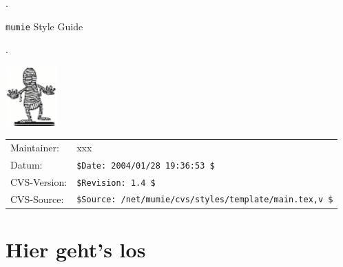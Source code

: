 \documentclass[12pt]{article}
\begin{document}

\thispagestyle{empty}

\vspace*{1cm}%


\begin{center}
\phantom.
\vspace*{5cm}

\texttt{\Huge mumie} \textsf{\Huge Style Guide}
\bigskip

\phantom.
\vspace*{3cm}

\ifx\pdfoutput\undefined
\else
  \includegraphics[width=2cm,angle=0]{../macros/mumie_klein.pdf}
\fi
\vspace*{3cm}

\begin{tabular}{ll}
\textsf{Maintainer:}& xxx\\
\textsf{Datum:}& \verb+$Date: 2004/01/28 19:36:53 $+\\                  %
\textsf{CVS-Version:}& \verb+$Revision: 1.4 $+\\                %
\textsf{CVS-Source:}&\verb+$Source: /net/mumie/cvs/styles/template/main.tex,v $+\\ %
\end{tabular}
\end{center}

\clearpage



\tableofcontents
\eject

\section{Hier geht's los}
\end{document}
